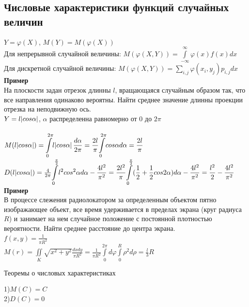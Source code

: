 \documentclass[russian, 12pt, fleqn]{article}
\begin{document}
\subsection{Числовые характеристики функций случайных величин}
$Y = \varphi(X)$, $M(Y) = M(\varphi(X))$\\
Для непрерывной  случайной величины: $M(\varphi(X, Y)) = \displaystyle{\int \limits _{-\infty}^{\infty} } \varphi(x) f(x) dx$\\
Для дискретной случайной  величины: $M(\varphi(X, Y)) = \displaystyle{\sum \limits _{i,j}^{} } \varphi(x_i, y_j) p_{i, j}  dx$\\
\textbf{Пример} \\
На плоскости задан отрезок длинны $l$, вращающаяся случайным образом так, что все направления одинаково вероятны. Найти среднее значение длинны проекции отрезка на неподвижную ось.\\
$Y = l \abs{cos \alpha}$, $\alpha$ распределенна равномерно от 0 до $2\pi$\\
\\
$M(l\abs{cos \alpha}) = \displaystyle{\int \limits_{0}^{2\pi}} l\abs{cos \alpha} \frac{d\alpha}{2\pi}=\frac{2l}{\pi} \displaystyle{\int \limits_{0}^{2\pi}} cos \alpha  d\alpha = \frac{2l}{\pi}$\\
$D(l\abs{cos \alpha}) = \frac{4}{2\pi}  \displaystyle{\int \limits_{0}^{\frac{\pi}{2}}} l^2cos^2 \alpha d\alpha  - \frac {4l^2}{\pi^2}= \frac{2l^2}{\pi} \displaystyle{\int \limits_{0}^{\frac{\pi}{2}}} (\frac{1}{2} + \frac{1}{2} cos 2\alpha) d\alpha - \frac{4l^2}{\pi^2} = \frac{l^2}{2} - \frac{4l^2}{\pi^2}$\\
\textbf{Пример}\\ В процессе слежения радиолокатором за определенным объектом пятно изображающее объект, все время удерживается в пределах экрана (круг радиуса $R$)  и занимает на нем случайное положение с постоянной плотностью вероятности. Найти среднее расстояние до центра экрана.\\
$f(x, y) = \frac{1}{\pi R^2}$\\
$M(r) = \displaystyle{\iint\limits_{K}} \sqrt{x^2+y^2}\frac{dxdy}{\pi R^2} = \frac{1}{\pi R^2} \displaystyle{\int\limits_{0}^{2\pi}} d \varphi \displaystyle{\int\limits_{0}^{R}} \rho^2 d \rho = \frac{l}{3} R$
\begin{center}
$\textbf{Теоремы о числовых характеристиках}$
\end{center}
1)$M(C) = C$\\
2)$D(C) = 0$\\
\end{document}
